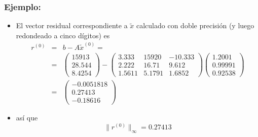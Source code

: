 \documentclass[10pt]{beamer}
\begin{document}
  \begin{frame}
    \frametitle{Ejemplo:}
    \begin{itemize}
      \item El vector residual correspondiente a $\tilde x$ calculado con doble precisi\'on (y luego redondeado a cinco d\'igitos) es 
      \small{
      \begin{eqnarray}
       \nonumber r^{(0)} & = & b - A \tilde x^{(0)} =\\
       \nonumber   & = & \left(\begin{array}{c}
            15913\\
            28.544\\
            8.4254
            \end{array}\right) - \left(\begin{array}{ccc}
             3.333 & 15920 & -10.333\\
             2.222 & 16.71 & 9.612\\
             1.5611 & 5.1791 & 1.6852
            \end{array}\right)\left(\begin{array}{c}
            1.2001\\
            0.99991\\
            0.92538
            \end{array}\right)\\
      \nonumber & = & \left(\begin{array}{c}
            -0.0051818\\
            0.27413\\
            -0.18616
            \end{array}\right)
      \end{eqnarray}}
      
      \item<2-> as\'i que 
       $$
       \|r^{(0)}\|_{\infty} = 0.27413
       $$
      \end{itemize}
    \end{frame}
\end{document}
